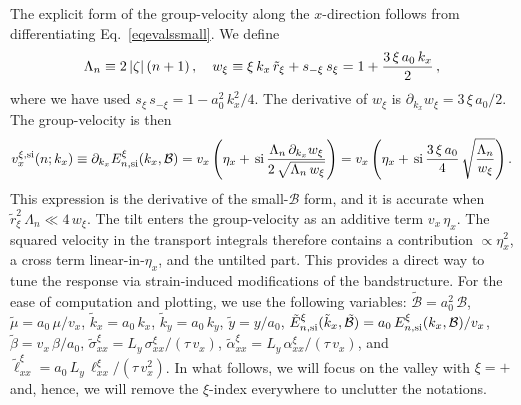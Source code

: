 \documentclass[aps,prb, onecolumn, nofootinbib, citeautoscript,10pt]{revtex4-2}
\begin{document}
The explicit form of the group-velocity along the $x$-direction follows from differentiating Eq.~\eqref{eqevalssmall}. We define
\begin{align}
\Lambda_n \equiv 2\,|\zeta|\,(n + 1)\,, \quad
w_\xi \equiv \xi\,k_x\,\tilde r_\xi + s_{-\xi}\,s_\xi = 1 + \frac{3\,\xi\,a_0\,k_x}{2}\,, \notag
\end{align}
where we have used $s_\xi\,s_{-\xi} = 1 - a_0^2\,k_x^2/4$. The derivative of $w_\xi$ is $\partial_{k_x} w_\xi = 3\,\xi\,a_0/2$. The group-velocity is then
\begin{align}
v^{\xi, \text{si}}_x (n; k_x) \equiv \partial_{k_x}  E^{\xi}_{n, \rm{si}} (k_x, \mathcal B)  
= v_x \left ( \eta_x +\, \mathrm{si}\, \frac{ \Lambda_n\,\partial_{k_x} w_\xi }
{ 2\, \sqrt{ \Lambda_n\,w_\xi } } \right )
= v_x \left ( \eta_x +\, \mathrm{si}\, \frac{3\,\xi\,a_0}{4} 
\,\sqrt{ \frac{ \Lambda_n }{ w_\xi } } \right ).
\label{eqgv}
\end{align}
This expression is the derivative of the small-$\mathcal B$ form, and it is accurate when $\tilde r_\xi^2\,\Lambda_n \ll 4\,w_\xi$. The tilt enters the group-velocity as an additive term $v_x\,\eta_x$. The squared velocity in the transport integrals therefore contains a contribution $\propto \eta_x^2$, a cross term linear-in-$\eta_x$, and the untilted part. This provides a direct way to tune the response via strain-induced modifications of the bandstructure. 
For the ease of computation and plotting, we use the following variables: $ \tilde{\mathcal B }  = a_0^2 \, \mathcal B$, $\tilde \mu  = a_0 \, \mu/ v_x $, $\tilde k_x  = a_0 \, k_x $, $\tilde k_y =  a_0 \, k_y $, $\tilde y = y/a_0 $, $\tilde  E^{\xi}_{n, \rm{si}} (\tilde k_x, \tilde{\mathcal B} ) = a_0 \,  E^{\xi}_{n, \rm{si}} (k_x, \mathcal B) / v_x $, $\tilde \beta =  v_x\, \beta/a_0 $, $\tilde \sigma^\xi_{xx}  = L_y \, \sigma_{xx}^\xi / (\tau \, v_x ) $, $ \tilde \alpha^\xi_{xx}  = L_y \, \alpha_{xx}^\xi / (\tau \, v_x ) $, and $ \tilde \ell^\xi_{xx}  = a_0 \, L_y \, \ell_{xx}^\xi / ( \tau \, v_x^2 ) $. In what follows, we will focus on the valley with $\xi = + $ and, hence, we will remove the $\xi$-index everywhere to unclutter the notations.
\end{document}
